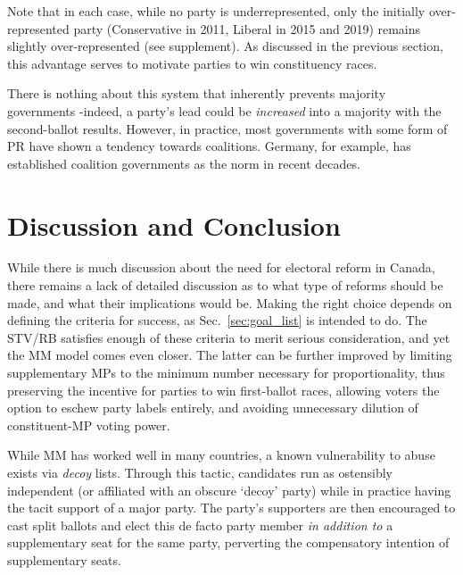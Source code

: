 Note that in each case, while no party is underrepresented, only the initially over-represented party (Conservative in 2011, Liberal in 2015 and 2019) remains slightly over-represented (see supplement).
As discussed in the previous section, this advantage serves to motivate parties to win constituency races.

There is nothing about this system that inherently prevents majority governments \--indeed, a party's lead could be \emph{increased} into a majority with the second-ballot results. However, in practice, most governments with some form of PR have shown a tendency towards coalitions.
Germany, for example, has established coalition governments as the norm in recent decades.

\section{Discussion and Conclusion}

While there is much discussion about the need for electoral reform in Canada, there remains a lack of detailed discussion as to what type of reforms should be made, and what their implications would be.
Making the right choice depends on defining the criteria for success, as Sec.~\ref{sec:goal_list} is intended to do.
The STV/RB satisfies enough of these criteria to merit serious consideration, and yet the MM model comes even closer.
The latter can be further improved by limiting supplementary MPs to the minimum number necessary for proportionality, thus preserving the incentive for parties to win first-ballot races, allowing voters the option to eschew party labels entirely, and avoiding unnecessary dilution of constituent-MP voting power.

%
While MM has worked well in many countries, a known vulnerability to abuse exists via \emph{decoy} lists.
Through this tactic, candidates run as ostensibly independent (or affiliated with an obscure `decoy' party) while in practice having the tacit support of a major party.
The party's supporters are then encouraged to cast split ballots and elect this de facto party member \emph{in addition to} a supplementary seat for the same party, perverting the compensatory intention of supplementary seats.


